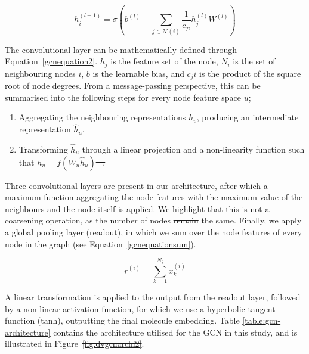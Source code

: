 \documentclass[journal=jcisd8,manuscript=article]{achemso} %
\providecommand{\DIFadd}[1]{{\protect\color{blue}\uwave{#1}}} %
\providecommand{\DIFdel}[1]{{\protect\color{red}\sout{#1}}}                      %
\providecommand{\DIFaddbegin}{} %
\providecommand{\DIFaddend}{} %
\providecommand{\DIFdelbegin}{} %
\providecommand{\DIFdelend}{} %
\begin{document}
\begin{equation}
    \label{gcnequation2}
    h_i^{(l+1)} = \sigma(b^{(l)} + \sum_{j\in\mathcal{N}(i)}\frac{1}{c_{ji}}h_j^{(l)}W^{(l)})
\end{equation}

The convolutional layer can be mathematically defined through Equation~\ref{gcnequation2}. $h_j$ is the feature set of the node, $N_i$ is the set of neighbouring nodes $i$, $b$ is the learnable bias, and $c_ji$ is the product of the square root of node degrees. From a message-passing perspective, this can be summarised into the following steps for every node feature space $u$;

\begin{enumerate}
    \item Aggregating the neighbouring representations $h_v$, producing an intermediate representation $\hat{h}_u$.
    \item Transforming $\hat{h}_u$ through a linear projection and a non-linearity function such that $h_u = f(W_u \hat{h}_u)$\DIFdelbegin \DIFdel{\mbox{%
\citep{kipf2016semi}}\hspace{0pt}%
. }\DIFdelend \DIFaddbegin \DIFadd{. \mbox{%
\citep{kipf2016semi}
}\hspace{0pt}%
}\DIFaddend \end{enumerate}

Three convolutional layers are present in our architecture, after which a maximum function aggregating the node features with the maximum value of the neighbours and the node itself is applied. We highlight that this is not a coarsening operation, as the number of nodes \DIFdelbegin \DIFdel{remain }\DIFdelend \DIFaddbegin \DIFadd{remains }\DIFaddend the same. Finally, we apply a global pooling layer (readout), in which we sum over the node features of every node in the graph (see Equation~\ref{gcnequationsum}). 

\begin{equation}
    \label{gcnequationsum}
    r^{(i)} = \sum_{k=1}^{N_i} x^{(i)}_k
\end{equation}

A linear transformation is applied to the output from the readout layer, followed by a non-linear activation function, \DIFdelbegin \DIFdel{for which we use }\DIFdelend \DIFaddbegin \DIFadd{which uses }\DIFaddend a hyperbolic tangent function (tanh), outputting the final molecule embedding. Table \ref{table:gcn-architecture} contains the architecture utilised for the GCN in this study, and is illustrated in Figure~\DIFdelbegin \DIFdel{\ref{fig:dvgcnarchi2}}\DIFdelend \DIFaddbegin \DIFadd{\ref{fig:dvgcnarchi}}\DIFaddend .
\end{document}
